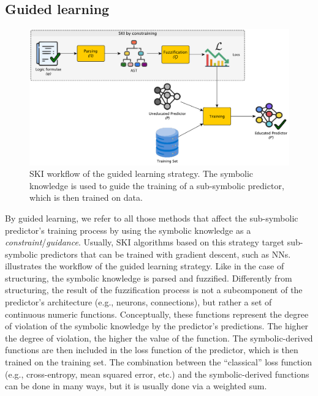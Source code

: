 \subsection{Guided learning}\label{subsec:guided-learning}
%
\begin{figure}
    \centering
    \includegraphics[width=.9\linewidth]{figures/workflow-constraining}
    \caption[SKI workflow of guided learning strategy]{
        \gls{SKI} workflow of the guided learning strategy.
        The symbolic knowledge is used to guide the training of a sub-symbolic predictor, which is then trained on data.
    }
    \label{fig:workflow-learning}
\end{figure}
%
By guided learning, we refer to all those methods that affect the sub-symbolic predictor's training process by using the symbolic knowledge as a \emph{constraint}/\emph{guidance}.
%
Usually, \gls{SKI} algorithms based on this strategy target sub-symbolic predictors that can be trained with gradient descent, such as \glspl{NN}.
%
 illustrates the workflow of the guided learning strategy.
%
Like in the case of structuring, the symbolic knowledge is parsed and fuzzified.
%
Differently from structuring, the result of the fuzzification process is not a subcomponent of the predictor's architecture (e.g., neurons, connections), but rather a set of continuous numeric functions.
%
Conceptually, these functions represent the degree of violation of the symbolic knowledge by the predictor's predictions.
%
The higher the degree of violation, the higher the value of the function.
%
The symbolic-derived functions are then included in the loss function of the predictor, which is then trained on the training set.
%
The combination between the ``classical'' loss function (e.g., cross-entropy, mean squared error, etc.) and the symbolic-derived functions can be done in many ways, but it is usually done via a weighted sum.


